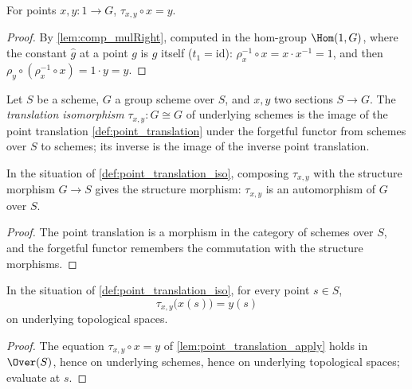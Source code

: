 \begin{lemma}
  \label{lem:point_translation_apply}
  \leanok
  For points \(x, y : 1 \to G\),
  \(\tau_{x,y} \circ x = y\).
\end{lemma}
\begin{proof}
  \leanok
  By \ref{lem:comp_mulRight}, computed in the hom-group \(\Hom(1, G)\), where
  the constant \(\hat g\) at a point \(g\) is \(g\) itself (\(t_1 =
  \mathrm{id}\)):
  \(\rho_x^{-1} \circ x = x \cdot x^{-1} = 1\), and then
  \(\rho_y \circ (\rho_x^{-1} \circ x) = 1 \cdot y = y\).
\end{proof}

\begin{definition}
  \label{def:point_translation_iso}
  \leanok
  Let \(S\) be a scheme, \(G\) a group scheme over \(S\), and \(x, y\) two
  sections \(S \to G\). The \emph{translation isomorphism}
  \(\tau_{x,y} : G \cong G\) of underlying schemes is the image of the point
  translation \ref{def:point_translation} under the forgetful functor from
  schemes over \(S\) to schemes; its inverse is the image of the inverse point
  translation.
\end{definition}

\begin{lemma}
  \label{lem:point_translation_iso_over}
  \leanok
  In the situation of \ref{def:point_translation_iso}, composing
  \(\tau_{x,y}\) with the structure morphism \(G \to S\) gives the structure
  morphism: \(\tau_{x,y}\) is an automorphism of \(G\) over \(S\).
\end{lemma}
\begin{proof}
  \leanok
  The point translation is a morphism in the category of schemes over \(S\),
  and the forgetful functor remembers the commutation with the structure
  morphisms.
\end{proof}

\begin{lemma}
  \label{lem:point_translation_iso_points}
  \leanok
  In the situation of \ref{def:point_translation_iso}, for every point
  \(s \in S\),
  \[
    \tau_{x,y}\bigl(x(s)\bigr) = y(s)
  \]
  on underlying topological spaces.
\end{lemma}
\begin{proof}
  \leanok
  The equation \(\tau_{x,y} \circ x = y\) of \ref{lem:point_translation_apply}
  holds in \(\Over(S)\), hence on underlying schemes, hence on underlying
  topological spaces; evaluate at \(s\).
\end{proof}

